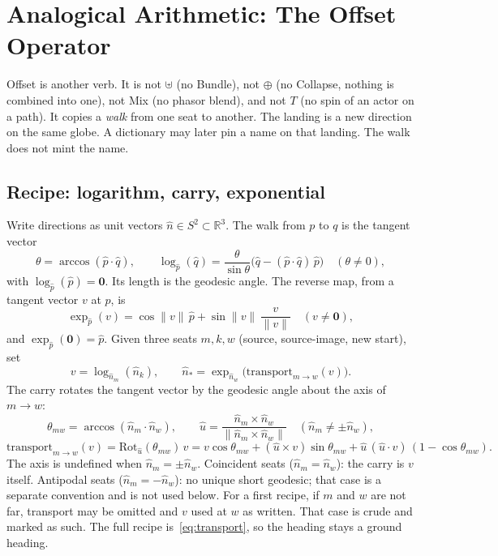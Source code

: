 \documentclass[12pt, a4paper]{article}
\begin{document}
\section{Analogical Arithmetic: The Offset Operator}
\label{sec:analogical_offset}

Offset is another verb. It is not $\uplus$ (no Bundle), not $\oplus$
(no Collapse, nothing is combined into one), not Mix
(no phasor blend), and not $T$
(no spin of an actor on a path). It copies a \emph{walk} from one
seat to another. The landing is a new direction on the same globe.
A dictionary may later pin a name on that landing. The walk does
not mint the name.

\subsection{Recipe: logarithm, carry, exponential}
\label{subsec:offset_logexp}
Write directions as unit vectors $\hat n\in S^2\subset\mathbb{R}^3$.
The walk from $p$ to $q$ is the tangent vector
\begin{equation}
    \theta = \arccos(\hat p\cdot\hat q),
    \qquad
    \log_{\hat p}(\hat q)
    = \frac{\theta}{\sin\theta}\bigl(\hat q-(\hat p\cdot\hat q)\,\hat p\bigr)
    \quad (\theta\neq 0),
    \label{eq:sphere_log}
\end{equation}
with $\log_{\hat p}(\hat p)=\mathbf{0}$. Its length is the geodesic
angle. The reverse map, from a tangent vector $v$ at $p$, is
\begin{equation}
    \exp_{\hat p}(v)
    = \cos\|v\|\,\hat p + \sin\|v\|\,\frac{v}{\|v\|}
    \quad (v\neq\mathbf{0}),
    \label{eq:sphere_exp}
\end{equation}
and $\exp_{\hat p}(\mathbf{0})=\hat p$. Given three seats
$m,k,w$ (source, source-image, new start), set
\begin{equation}
    v = \log_{\hat n_m}(\hat n_k),
    \qquad
    \hat n_{*}
    = \exp_{\hat n_w}\bigl(\mathrm{transport}_{m\to w}(v)\bigr).
    \label{eq:analogical_offset}
\end{equation}
The carry rotates the tangent vector by the geodesic angle about the
axis of $m\to w$:
\begin{equation}
    \theta_{mw} = \arccos(\hat n_m\cdot\hat n_w),
    \qquad
    \hat u
    = \frac{\hat n_m\times\hat n_w}{\|\hat n_m\times\hat n_w\|}
    \quad (\hat n_m\neq\pm\hat n_w),
    \label{eq:transport_axis}
\end{equation}
\begin{equation}
    \mathrm{transport}_{m\to w}(v)
    = \mathrm{Rot}_{\hat u}(\theta_{mw})\, v
    = v\cos\theta_{mw}
      + (\hat u\times v)\sin\theta_{mw}
      + \hat u\,(\hat u\cdot v)\,(1-\cos\theta_{mw}).
    \label{eq:transport}
\end{equation}
The axis is undefined when $\hat n_m=\pm\hat n_w$.
Coincident seats ($\hat n_m=\hat n_w$): the carry is $v$ itself.
Antipodal seats ($\hat n_m=-\hat n_w$): no unique short geodesic;
that case is a separate convention and is not used below.
For a first recipe, if $m$ and $w$ are not far, transport may be
omitted and $v$ used at $w$ as written. That case is crude and
marked as such. The full recipe is~\eqref{eq:transport}, so the
heading stays a ground heading.
\end{document}
